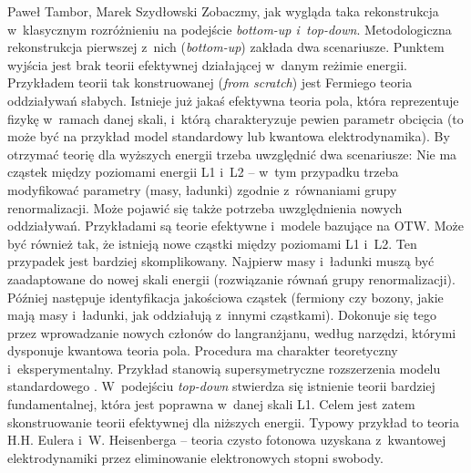 \begin{artplenv}{Paweł Tambor, Marek Szydłowski}
Zobaczmy, jak wygląda taka rekonstrukcja w~klasycznym rozróżnieniu na podejście \textit{bottom-up i~top-down}. Metodologiczna rekonstrukcja pierwszej z~nich (\textit{bottom-up}) zakłada dwa scenariusze. Punktem wyjścia jest brak teorii efektywnej działającej w~danym reżimie energii. Przykładem teorii tak konstruowanej (\textit{from scratch}) jest Fermiego teoria oddziaływań słabych. Istnieje już jakaś efektywna teoria pola, która reprezentuje fizykę w~ramach danej skali, i~którą charakteryzuje pewien parametr obcięcia (to może być na przykład model standardowy lub kwantowa elektrodynamika). By otrzymać teorię dla wyższych energii trzeba uwzględnić dwa scenariusze: Nie ma cząstek między poziomami energii L1 i~L2 -- w~tym przypadku trzeba modyfikować parametry (masy, ładunki) zgodnie z~równaniami grupy renormalizacji. Może pojawić się także potrzeba uwzględnienia nowych oddziaływań. Przykładami są teorie efektywne i~modele bazujące na OTW. Może być również tak, że istnieją nowe cząstki między poziomami L1 i~L2. Ten przypadek jest bardziej skomplikowany. Najpierw masy i~ładunki muszą być zaadaptowane do nowej skali energii (rozwiązanie równań grupy renormalizacji). Później następuje identyfikacja jakościowa cząstek (fermiony czy bozony, jakie mają masy i~ładunki, jak oddziałują z~innymi cząstkami). Dokonuje się tego przez wprowadzanie nowych członów do langranżjanu, według narzędzi, którymi dysponuje kwantowa teoria pola. Procedura ma charakter teoretyczny i~eksperymentalny. Przykład stanowią supersymetryczne rozszerzenia modelu standardowego
\parencites[][]{cao_conceptual_1993}[por.][]{cao_why_1999}[][]{arnold_metody_1981}[][]{kane_supersymetria_2006}. %
 W~podejściu \textit{top-down} stwierdza się istnienie teorii bardziej fundamentalnej, która jest poprawna w~danej skali L1. Celem jest zatem skonstruowanie teorii efektywnej dla niższych energii. Typowy przykład to teoria H.H. Eulera i~W. Heisenberga -- teoria czysto fotonowa uzyskana z~kwantowej elektrodynamiki przez eliminowanie elektronowych stopni swobody.


\end{artplenv}
